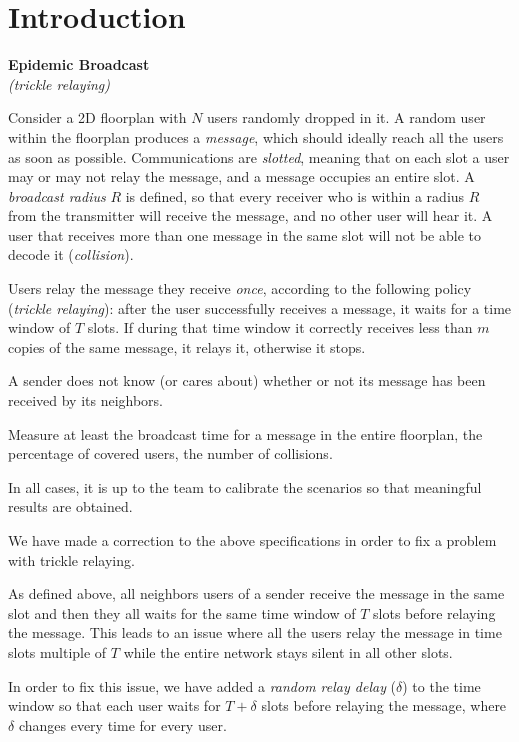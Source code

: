 \chapter{Introduction}\label{ch:introduction}

\begin{center}
	\Large \textbf{Epidemic Broadcast}\\
	\normalsize \textit{(trickle relaying)}
\end{center}

Consider a 2D floorplan with \(N\) users randomly dropped in it. A random user
within the floorplan produces a \emph{message}, which should ideally reach all
the users as soon as possible. Communications are \emph{slotted}, meaning that
on each slot a user may or may not relay the message, and a message occupies an
entire slot. A \emph{broadcast radius} \(R\) is defined, so that every receiver
who is within a radius \(R\) from the transmitter will receive the message, and
no other user will hear it. A user that receives more than one message in the
same slot will not be able to decode it (\emph{collision}).

Users relay the message they receive \emph{once}, according to the following
policy (\emph{trickle relaying}): after the user successfully receives a
message, it waits for a time window of \(T\) slots. If during that time window
it correctly receives less than \(m\) copies of the same message, it relays it,
otherwise it stops.

A sender does not know (or cares about) whether or not its message has been
received by its neighbors.

Measure at least the broadcast time for a message in the entire floorplan, the
percentage of covered users, the number of collisions.

In all cases, it is up to the team to calibrate the scenarios so that meaningful
results are obtained.

\begin{tcolorbox}[title=Note]
	We have made a correction to the above specifications in order to fix a
	problem with trickle relaying.

	As defined above, all neighbors users of a sender receive the message in
	the same slot and then they all waits for the same time window of \(T\)
	slots before relaying the message. This leads to an issue where all the
	users relay the message in time slots multiple of \(T\) while the entire
	network stays silent in all other slots.

	In order to fix this issue, we have added a \emph{random relay delay}
	(\(\delta\)) to the time window so that each user waits for \(T+\delta\)
	slots before relaying the message, where \(\delta\) changes every time
	for every user.
\end{tcolorbox}

